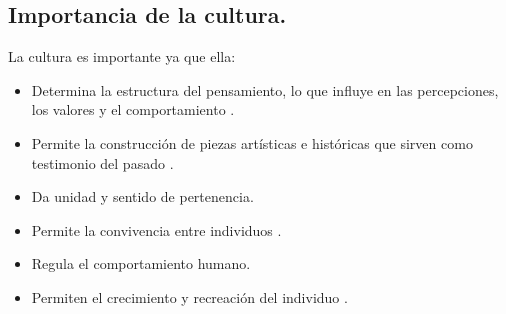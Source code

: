         \subsection{Importancia de la cultura.}\label{CulturaImpo}
        La cultura es importante ya que ella:
        \begin{itemize}
                \item Determina la estructura del pensamiento, lo que influye en 
                las percepciones, los valores y el comportamiento \cite{RefImporCul}.
                \item Permite la construcción de piezas artísticas e históricas 
                que sirven como testimonio del pasado \cite{RefImpoCulAr}.              
                \item Da unidad y sentido de pertenencia\cite{RefImpoUnidad}.
                \item Permite la convivencia entre individuos \cite{RefImporCul}.
                \item Regula el comportamiento humano\cite{RefImporCul}.
                \item Permiten el crecimiento y recreación del individuo
                \cite{RefImpoCulAr}.
        \end{itemize}